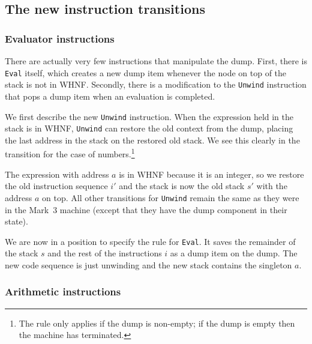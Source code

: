 \subsection{The new instruction transitions}
\label{gm:sc:inst4}

\subsubsection{Evaluator instructions}

There are actually very few instructions that manipulate the dump.
First, there is \mbox{\tt Eval} itself, which creates a new dump item whenever
the node on top of the stack is not in WHNF. Secondly, there is a
modification to the \mbox{\tt Unwind} instruction that pops a dump item when an
evaluation is completed.

We first describe the new \mbox{\tt Unwind} instruction. When the expression
held in the stack is in WHNF, \mbox{\tt Unwind} can restore the old context
from the dump, placing the last address in the stack on the restored
old stack. We see this clearly in the transition for the case of
numbers.\footnote{The rule only applies if the dump is non-empty; if
the dump is empty then the machine has terminated.}

\gmruled%
{}%
{}

The expression with address $a$ is in WHNF because it is an integer,
so we restore the old instruction sequence $i'$ and the stack is now
the old stack $s'$ with the address $a$ on top. All other transitions
for \mbox{\tt Unwind} remain the same as they were in the Mark~3 machine
(except that they have the dump component in their state).

We are now in a position to specify the rule for \mbox{\tt Eval}. It saves the
remainder of the stack $s$ and the rest of the instructions $i$ as a
dump item on the dump. The new code sequence is just unwinding and the
new stack contains the singleton $a$.

\gmruled%
{}%
{}

\subsubsection{Arithmetic instructions}

